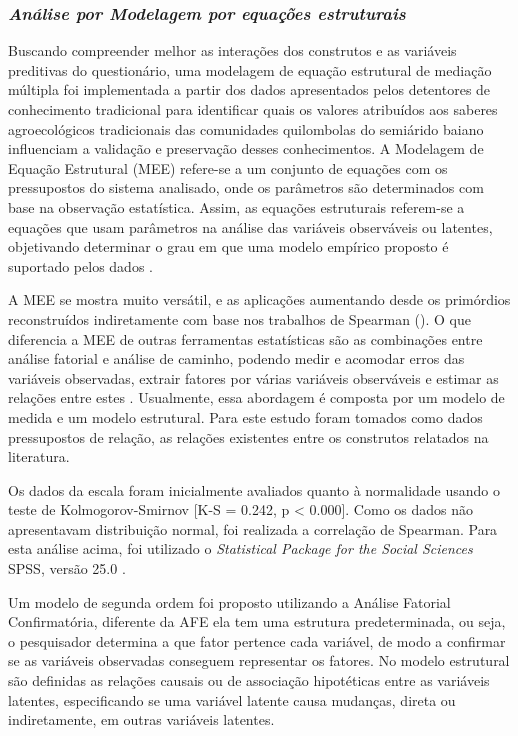 \subsubsection*{\textit{Análise por Modelagem por equações estruturais}}

Buscando compreender melhor as interações dos construtos e as variáveis preditivas do questionário, uma modelagem de equação estrutural de mediação múltipla foi implementada a partir dos dados apresentados pelos detentores de conhecimento tradicional para identificar quais os valores atribuídos aos saberes agroecológicos tradicionais das comunidades quilombolas do semiárido baiano influenciam a validação e preservação desses conhecimentos. A Modelagem de Equação Estrutural (MEE) refere-se a um conjunto de equações com os pressupostos do sistema analisado, onde os parâmetros são determinados com base na observação estatística. Assim, as equações estruturais referem-se a equações que usam parâmetros na análise das variáveis observáveis ou latentes, objetivando determinar o grau em que uma modelo empírico proposto é suportado pelos dados \cite{Tarka2018AnSciences}.

A MEE se mostra muito versátil, e as aplicações aumentando desde os primórdios  reconstruídos indiretamente com base nos trabalhos de Spearman (\citeyear{spearman_C_1904,Spearman_1927}). O que diferencia a MEE de outras ferramentas estatísticas são as combinações entre análise fatorial e análise de caminho, podendo medir e acomodar erros das variáveis observadas, extrair fatores por várias variáveis observáveis e estimar as relações entre estes \cite{Xiong2016}. Usualmente, essa abordagem é composta por um modelo de medida e um modelo estrutural. Para este estudo foram tomados como dados pressupostos de relação, as relações existentes entre os construtos relatados na literatura.

Os dados da escala foram inicialmente avaliados quanto à normalidade usando o teste de Kolmogorov-Smirnov [K-S = 0.242, p < 0.000]. Como os dados não apresentavam distribuição normal, foi realizada a correlação de Spearman. Para esta análise acima, foi utilizado o \textit{Statistical Package for the Social Sciences} SPSS, versão 25.0 \cite{SPSSCorp2017}.

Um modelo de segunda ordem foi proposto utilizando a Análise Fatorial Confirmatória, diferente da AFE ela tem uma estrutura predeterminada, ou seja, o pesquisador determina a que fator pertence cada variável, de modo a confirmar se as variáveis observadas conseguem  representar os fatores. No modelo estrutural são definidas as relações causais ou de associação hipotéticas entre as variáveis latentes, especificando se uma variável latente causa mudanças, direta ou indiretamente, em outras variáveis latentes.

